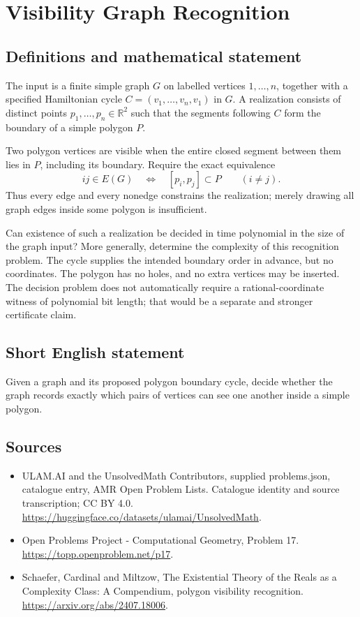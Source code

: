 \documentclass[11pt,a4paper]{article}
\begin{document}
\section*{Visibility Graph Recognition}\label{statement}

\subsection{Definitions and mathematical statement}
The input is a finite simple graph $G$ on labelled vertices
$1,\ldots,n$, together with a specified Hamiltonian cycle
$C=(v_1,\ldots,v_n,v_1)$ in $G$. A realization consists of distinct
points $p_1,\ldots,p_n\in\mathbb R^2$ such that the segments following
$C$ form the boundary of a simple polygon $P$.

Two polygon vertices are visible when the entire closed segment between
them lies in $P$, including its boundary. Require the exact equivalence
\[
            ij\in E(G)\quad\Longleftrightarrow\quad[p_i,p_j]\subset P
            \qquad(i\ne j).
\]
Thus every edge and every nonedge constrains the realization; merely
drawing all graph edges inside some polygon is insufficient.

Can existence of such a realization be decided in time polynomial in
the size of the graph input? More generally, determine the complexity
of this recognition problem. The cycle supplies the intended boundary
order in advance, but no coordinates. The polygon has no holes, and
no extra vertices may be inserted. The decision problem does not
automatically require a rational-coordinate witness of polynomial
bit length; that would be a separate and stronger certificate claim.
\subsection{Short English statement}
Given a graph and its proposed polygon boundary cycle, decide whether
the graph records exactly which pairs of vertices can see one another
inside a simple polygon.
\subsection{Sources}
\begin{itemize}
\item[S1] ULAM.AI and the UnsolvedMath Contributors, supplied problems.json, catalogue entry, AMR Open Problem Lists. Catalogue identity and source transcription; CC BY 4.0.
\url{https://huggingface.co/datasets/ulamai/UnsolvedMath}.
\item[S2] Open Problems Project - Computational Geometry, Problem 17. 
\url{https://topp.openproblem.net/p17}.
\item[S3] Schaefer, Cardinal and Miltzow, The Existential Theory of the Reals as a Complexity Class: A Compendium, polygon visibility recognition.
\url{https://arxiv.org/abs/2407.18006}.
\end{itemize}
\end{document}
